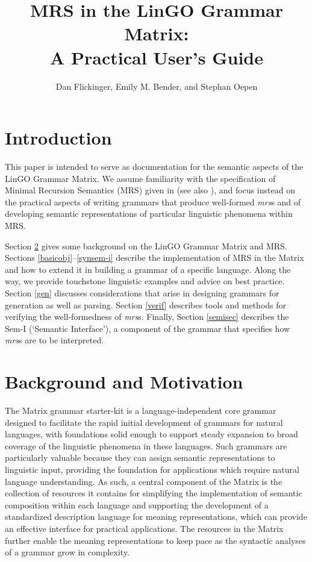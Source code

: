 \documentclass[12pt]{article}
\title{MRS in the LinGO Grammar Matrix:\\ A Practical User's Guide}
\author{Dan Flickinger, Emily M. Bender, and Stephan Oepen}
\begin{document}
\maketitle

\setcounter{tocdepth}{2}  %
\tableofcontents
\newpage
\section{Introduction}

This paper is intended to serve as documentation for the semantic
aspects of the LinGO Grammar Matrix. We assume familiarity with the
specification of Minimal Recursion Semantics (MRS) given in
 (see also ),
and focus instead on the practical aspects of writing grammars
that produce well-formed {\it mrs}s and of developing semantic
representations of particular linguistic phenomena within MRS.

Section \ref{backmot} gives some background on the LinGO Grammar
Matrix and MRS.  Sections \ref{basicobj}--\ref{synsem-i} describe
the implementation of MRS in the Matrix and how to extend it in
building a grammar of a specific language.  Along the way, we
provide touchstone linguistic examples and advice on best practice.
Section \ref{gen}
discusses considerations that arise in designing grammars for
generation as well as parsing.  Section \ref{verif} describes tools
and methods for verifying the well-formedness of {\it mrs}s.  Finally,
Section \ref{semisec} describes the Sem-I (`Semantic Interface'), a component
of the grammar that specifies how {\it mrs}s are to be interpreted.

\section{Background and Motivation}
\label{backmot}

The Matrix grammar starter-kit \cite{Ben:Fli:Oep:02} is a
language-independent core grammar designed to facilitate the rapid
initial development of grammars for natural languages, with
foundations solid enough to support steady expansion to broad coverage
of the linguistic phenomena in these languages.  Such grammars are
particularly valuable because they can assign semantic representations
to linguistic input, providing the foundation for applications which
require natural language understanding.  As such, a central component
of the Matrix is the collection of resources it contains for
simplifying the implementation of semantic composition within each
language and supporting the development of a standardized description
language for meaning representations, which can provide an effective
interface for practical applications.  The resources in the Matrix
further enable the meaning representations to keep pace as the
syntactic analyses of a grammar grow in complexity.
\end{document}
